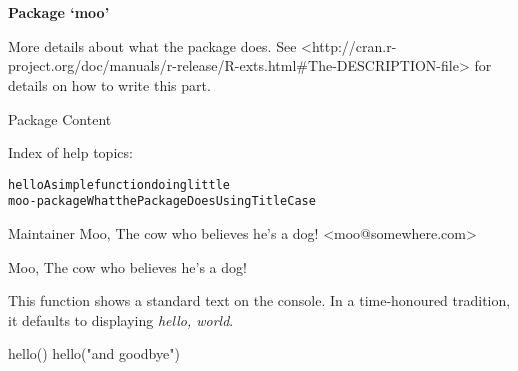 \documentclass[a4paper]{book}
\begin{document}
\chapter*{}
\begin{center}
{\textbf{\huge Package `moo'}}
\par\bigskip{\large \today}
\end{center}
\begin{description}
\raggedright{}
\item[Type]
\item[Title]
\item[Version]
\item[Date]
\item[Author]
\item[Maintainer]\AsIs{}
\item[Description]
\item[License]
\item[NeedsCompilation]
\end{description}
%
\begin{Description}\relax
More details about what the package does. See
           <http://cran.r-project.org/doc/manuals/r-release/R-exts.html\#The-DESCRIPTION-file> for details
           on how to write this part.
\end{Description}
%
\begin{Section}{Package Content}

Index of help topics:
\begin{alltt}
hello                   A simple function doing little
moo-package             What the Package Does Using Title Case
\end{alltt}
\end{Section}
%
\begin{Section}{Maintainer}
Moo, The cow who believes he's a dog! <moo@somewhere.com>
\end{Section}
%
\begin{Author}\relax
Moo, The cow who believes he's a dog!
\end{Author}
%
\begin{Description}\relax
This function shows a standard text on the console. In a time-honoured
tradition, it defaults to displaying \emph{hello, world}.
\end{Description}
%
\begin{Examples}
\begin{ExampleCode}
  hello()
  hello("and goodbye")
\end{ExampleCode}
\end{Examples}
\printindex{}
\end{document}
